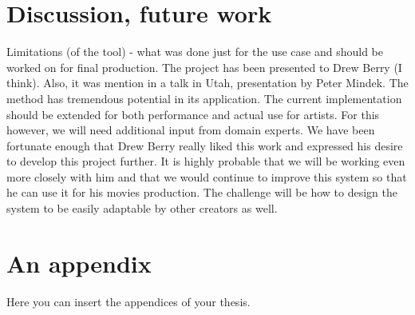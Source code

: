 \documentclass[
  digital, %
  table,   %
  nolof,     %
  nolot,     %
]{fithesis3}
\begin{document}
\chapter{Discussion, future work}
Limitations (of the tool) - what was done just for the use case and should be worked on for final production.
The project has been presented to Drew Berry (I think). Also, it was mention in a talk in Utah, presentation by Peter Mindek.
The method has tremendous potential in its application. The current implementation should be extended for both performance and actual use for artists. For this however, we will need additional input from domain experts. We have been fortunate enough that Drew Berry really liked this work and expressed his desire to develop this project further. It is highly probable that we will be working even more closely with him and that we would continue to improve this system so that he can use it for his movies production.
The challenge will be how to design the system to be easily adaptable by other creators as well.

\appendix %
\chapter{An appendix}
Here you can insert the appendices of your thesis.
\end{document}
